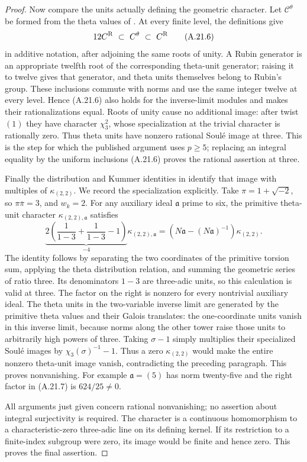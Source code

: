 \begin{proof}
Now compare the units actually defining the geometric
character. Let \(\mathcal C^{\theta}\) be formed from
the theta values of \cite[\S2.2]{DE_Ishii2024}.
At every finite level, the definitions give
\[
 12 C^{\rm R}\ \subset\ C^{\theta}\ \subset\ C^{\rm R}
                                                               \tag{A.21.6}
\]
in additive notation, after adjoining the same roots
of unity. A Rubin generator is an appropriate twelfth
root of the corresponding theta-unit generator;
raising it to twelve gives that generator, and theta
units themselves belong to Rubin's group. These
inclusions commute with norms and use the same
integer twelve at every level. Hence (A.21.6) also
holds for the inverse-limit modules and makes their
rationalizations equal. Roots of unity cause no
additional image: after twist \((1)\) they have
character \(\chi_3^2\), whose specialization at the
trivial character is rationally zero. Thus theta
units have nonzero rational Soul\'e image at three.
This is the step for which the published argument
uses \(p\ge5\); replacing an integral equality by the
uniform inclusions (A.21.6) proves the rational
assertion at three.

Finally the distribution and Kummer identities in
\cite[\S3.1 and \S4.1]{DE_Ishii2024} identify that
image with multiples of \(\kappa_{(2,2)}\). We record
the specialization explicitly. Take
\(\pi=1+\sqrt{-2}\), so \(\pi\overline\pi=3\),
and \(w_k=2\). For any auxiliary ideal \(\mathfrak a\)
prime to six, the primitive theta-unit character
\(\kappa_{(2,2),\mathfrak a}\) satisfies
\[
 \underbrace{2\left(\frac1{1-3}+\frac1{1-3}-1\right)}_{-4}
       \kappa_{(2,2),\mathfrak a}
   =\left(N\mathfrak a-(N\mathfrak a)^{-1}\right)
       \kappa_{(2,2)}.                                  \tag{A.21.7}
\]
The identity follows by separating the two coordinates
of the primitive torsion sum, applying the theta
distribution relation, and summing the geometric
series of ratio three. Its denominators \(1-3\)
are three-adic units, so this calculation is valid at
three. The factor on the right is nonzero for every
nontrivial auxiliary ideal. The theta units in the
two-variable inverse limit are generated by the
primitive theta values and their Galois translates:
the one-coordinate units vanish in this inverse
limit, because norms along the other tower raise
those units to arbitrarily high powers of three.
Taking \(\sigma-1\) simply multiplies their specialized
Soul\'e images by \(\chi_3(\sigma)^{-1}-1\).
Thus a zero \(\kappa_{(2,2)}\) would make the entire
nonzero theta-unit image vanish, contradicting the
preceding paragraph. This proves nonvanishing.
For example \(\mathfrak a=(5)\) has norm twenty-five
and the right factor in (A.21.7) is \(624/25\ne0\).

All arguments just given concern rational nonvanishing;
no assertion about integral surjectivity is required.
The character is a continuous homomorphism to a
characteristic-zero three-adic line on its defining
kernel. If its restriction to a finite-index subgroup
were zero, its image would be finite and hence zero.
This proves the final assertion.
\end{proof}
